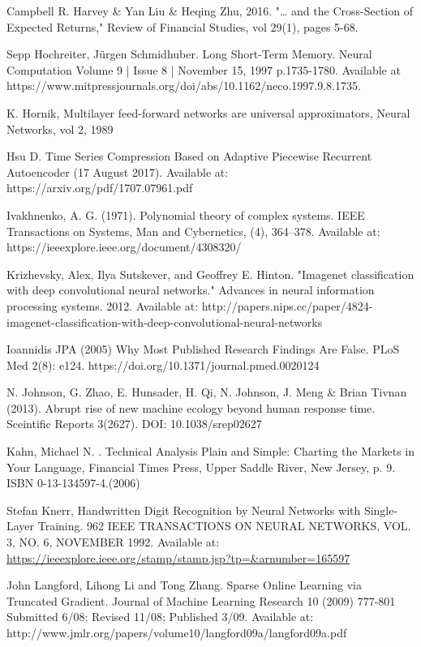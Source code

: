 \documentclass[a4paper,latin]{paper}
\begin{document}
\begin{thebibliography}{bibliography}
Campbell R. Harvey \& Yan Liu \& Heqing Zhu, 2016. "… and the Cross-Section of Expected Returns," Review of Financial Studies, vol 29(1), pages 5-68.

Sepp Hochreiter,  Jürgen Schmidhuber. Long Short-Term Memory. Neural Computation Volume 9 | Issue 8 | November 15, 1997  
p.1735-1780. Available at https://www.mitpressjournals.org/doi/abs/10.1162/neco.1997.9.8.1735.

K. Hornik, Multilayer feed-forward networks are universal approximators, Neural Networks, vol 2, 1989

Hsu D. Time Series Compression Based on Adaptive Piecewise
Recurrent Autoencoder (17 August 2017). Available at: https://arxiv.org/pdf/1707.07961.pdf

Ivakhnenko, A. G. (1971). Polynomial theory of complex systems. IEEE Transactions
on Systems, Man and Cybernetics, (4), 364–378. Available at: https://ieeexplore.ieee.org/document/4308320/

Krizhevsky, Alex, Ilya Sutskever, and Geoffrey E. Hinton. "Imagenet classification with deep convolutional neural networks." Advances in neural information processing systems. 2012.
Available at: http://papers.nips.cc/paper/4824-imagenet-classification-with-deep-convolutional-neural-networks

Ioannidis JPA (2005) Why Most Published Research Findings Are False. PLoS Med 2(8): e124. https://doi.org/10.1371/journal.pmed.0020124

N. Johnson, G. Zhao, E. Hunsader, H. Qi, N. Johnson, J. Meng \& Brian Tivnan (2013). Abrupt rise of new machine ecology beyond human response time. Sceintific Reports 3(2627). DOI: 10.1038/srep02627

Kahn, Michael N. . Technical Analysis Plain and Simple: Charting the Markets in Your Language, Financial Times Press, Upper Saddle River, New Jersey, p. 9. ISBN 0-13-134597-4.(2006)

Stefan Knerr, Handwritten Digit Recognition by Neural Networks with Single-Layer 
Training. 962 IEEE TRANSACTIONS ON NEURAL NETWORKS, VOL. 3, NO. 6, NOVEMBER 
1992. Available at: \url{https://ieeexplore.ieee.org/stamp/stamp.jsp?tp=&arnumber=165597 }


John Langford, Lihong Li and Tong Zhang. Sparse Online Learning via Truncated 
Gradient. Journal of Machine Learning Research 10 (2009) 777-801 Submitted 6/08; Revised 11/08; Published 
3/09. Available at: http://www.jmlr.org/papers/volume10/langford09a/langford09a.pdf 


\end{thebibliography}
\end{document}
